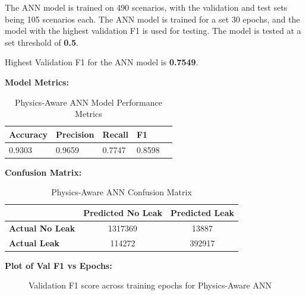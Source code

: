 \documentclass[final,5p,times,twocolumn,authoryear]{elsarticle}
\begin{document}
The ANN model is trained on 490 scenarios, with the validation and test sets being 105 scenarios each. The ANN model is trained for a set 30 epochs, and the model with the highest validation F1 is used for testing. The model is tested at a set threshold of \textbf{0.5}.

Highest Validation F1 for the ANN model is \textbf{0.7549}.

\vspace{0.03cm}

\textbf{Model Metrics:}

\begin{table}[H]
\centering
\caption{Physics-Aware ANN Model Performance Metrics}
\label{tab:paann_metrics}
\begin{tabular}{@{}lllll@{}}
\toprule
\textbf{Accuracy} & \textbf{Precision} & \textbf{Recall} & \textbf{F1} \\ \midrule
0.9303       & 0.9659        & 0.7747      & 0.8598     \\ \bottomrule
\end{tabular}
\end{table}

\textbf{Confusion Matrix:}

\begin{table}[H]
\centering
\caption{Physics-Aware ANN Confusion Matrix}
\label{tab:conf_matrix_paann}
\begin{tabular}{lcc}
\toprule
 & \textbf{Predicted No Leak} & \textbf{Predicted Leak} \\
\midrule
\textbf{Actual No Leak} & 1317369 & 13887 \\
\textbf{Actual  Leak} & 114272 & 392917 \\
\bottomrule
\end{tabular}
\end{table}

\textbf{Plot of Val F1 vs Epochs:}


\begin{figure}[H]
\centering
{}
\caption{Validation F1 score across training epochs for Physics-Aware ANN}
\label{fig:val_f1_paann}
\end{figure}
\end{document}

